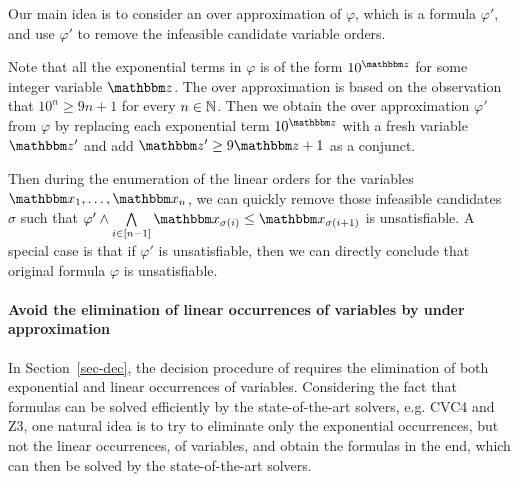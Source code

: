 Our main idea is to consider an over approximation of $\varphi$, which is a {\pa} formula $\varphi'$, and use $\varphi'$ to remove the infeasible candidate variable orders.

Note that all the exponential terms in $\varphi$ is of the form $10^{\ivarz}$ for some integer variable $\ivarz$. 
%
The over approximation is based on the observation that $10^n \ge 9 n + 1$ for every $n \in \mathbb{N}$. Then we obtain the over approximation $\varphi'$ from $\varphi$ by replacing each exponential term $10^{\ivarz}$ with a fresh variable $\ivarz'$ and add $\ivarz' \ge 9 \ivarz +1$ as a conjunct.

Then during the enumeration of the linear orders for the variables $\ivarx_1, \ldots, \ivarx_n$, we can quickly remove those infeasible candidates $\sigma$ such that $\varphi' \wedge \bigwedge \limits_{i \in [n-1]}\ivarx_{\sigma(i)} \le \ivarx_{\sigma(i+1)}$ is unsatisfiable. A special case is that if $\varphi'$ is unsatisfiable, then we can directly conclude that original formula $\varphi$ is unsatisfiable.




\paragraph{Avoid the elimination of linear occurrences of variables by under approximation}\label{para: opt under appro}

In Section~\ref{sec-dec}, the decision procedure of {\paexp} requires the elimination of both exponential and linear occurrences of variables. Considering the fact that {\pa} formulas can be solved efficiently by the state-of-the-art solvers, e.g. CVC4 and Z3, one natural idea is to try to eliminate only the exponential occurrences, but not the linear occurrences, of variables, and obtain the {\pa} formulas in the end, which can then be solved by the state-of-the-art solvers.


